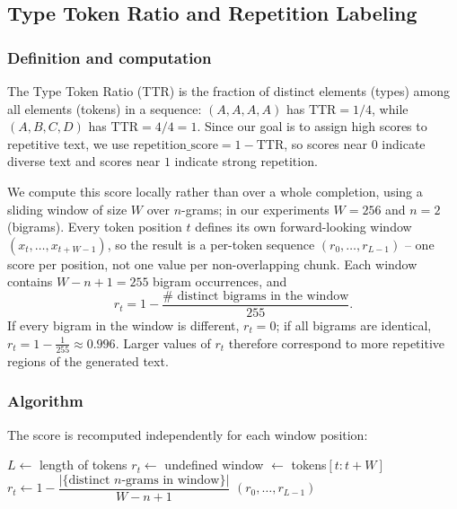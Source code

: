 \documentclass{article}
\begin{document}
\subsection{Type Token Ratio and Repetition Labeling}
\label{sec:ttr-labeling}

\subsubsection{Definition and computation}

The Type Token Ratio (TTR) is the fraction of distinct elements (types)
among all elements (tokens) in a sequence: $(A,A,A,A)$ has $\mathrm{TTR}=1/4$,
while $(A,B,C,D)$ has $\mathrm{TTR}=4/4=1$. Since our goal is to assign high
scores to repetitive text, we use
$\mathrm{repetition\_score}=1-\mathrm{TTR}$, so scores near $0$ indicate
diverse text and scores near $1$ indicate strong repetition.

We compute this score locally rather than over a whole completion, using a
sliding window of size $W$ over $n$-grams; in our experiments $W=256$ and
$n=2$ (bigrams). Every token position $t$ defines its own forward-looking
window $(x_t,\ldots,x_{t+W-1})$, so the result is a per-token sequence
$(r_0,\ldots,r_{L-1})$ -- one score per position, not one value per
non-overlapping chunk. Each window contains $W-n+1=255$ bigram occurrences,
and
\[
r_t = 1-\frac{\#\text{ distinct bigrams in the window}}{255}.
\]
If every bigram in the window is different, $r_t=0$; if all bigrams are
identical, $r_t=1-\tfrac1{255}\approx0.996$. Larger values of $r_t$
therefore correspond to more repetitive regions of the generated text.

\subsubsection{Algorithm}

The score is recomputed independently for each window position:

\begin{algorithm}[h]
\caption{Sliding-window repetition score}
\label{alg:ttr-sliding-window}
\begin{algorithmic}[1]
    \State $L \gets$ length of tokens
         
            \State $r_t \gets$ undefined
        \Else
            \State window $\gets$ tokens$[t : t+W]$
            \State $r_t \gets 1 - \dfrac{|\{\text{distinct } n\text{-grams in window}\}|}{W-n+1}$
        \EndIf
    \EndFor
    \State \Return $(r_0, \ldots, r_{L-1})$
\EndFunction
\end{algorithmic}
\end{algorithm}
\end{document}
